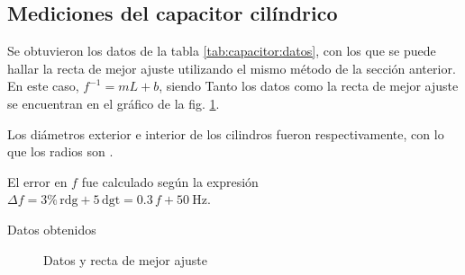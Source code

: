 \subsection{Mediciones del capacitor cilíndrico}

Se obtuvieron los datos de la tabla \ref{tab:capacitor:datos}, con los que se 
puede hallar la recta de mejor ajuste utilizando el mismo método de la sección
anterior. En este caso, $f^{-1} = mL + b$, siendo
 Tanto los datos como la recta de mejor ajuste se encuentran en el gráfico de la
fig. \ref{fig:capacitor:rectas}.

Los diámetros exterior e interior de los cilindros fueron 
 respectivamente,
con lo que los radios son 
.

El error en $f$ fue calculado según la expresión
$\Delta f = 3\%\,\text{rdg} + 5\,\text{dgt}
          = 0.3\, f + \SI{50}{\hertz}$.
\vspace{10mm}
\begin{table}[H]
    \centering
    \caption{Datos obtenidos}
    \label{tab:capacitor:datos}
\end{table}

\begin{figure}[H]
    \centering
    
    \caption{Datos y recta de mejor ajuste}
    \label{fig:capacitor:rectas}
\end{figure}
